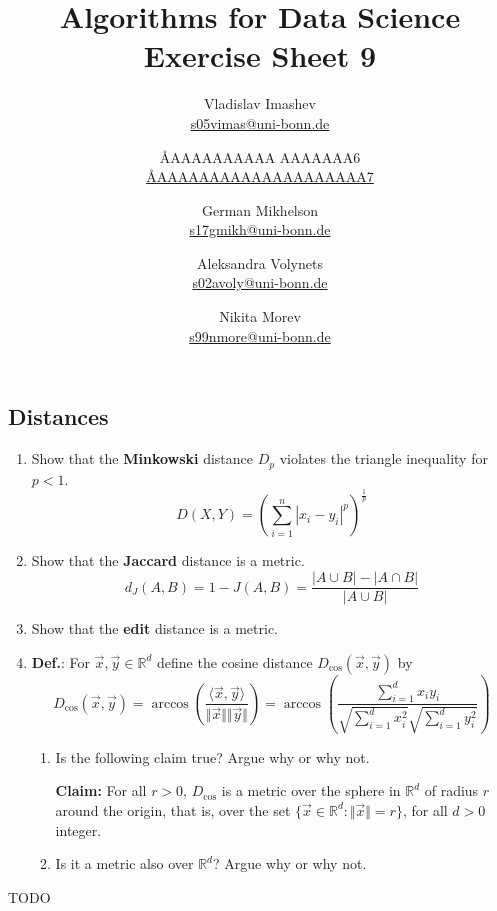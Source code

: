 \documentclass{article}
\title{Algorithms for Data Science \\ Exercise Sheet 9}
\author{
  Vladislav Imashev \\ \href{mailto:s05vimas@uni-bonn.de}{s05vimas@uni-bonn.de} \and
  \AA{AAAAAAAAAA AAAAAAA}{6} \\ \href{mailto:\AA{AAAAAAAAAAAAAAAAAAAA}{7}}{\AA{AAAAAAAAAAAAAAAAAAAA}{7}} \and
  German Mikhelson \\ \href{mailto:s17gmikh@uni-bonn.de}{s17gmikh@uni-bonn.de} \and
  Aleksandra Volynets \\ \href{mailto:s02avoly@uni-bonn.de}{s02avoly@uni-bonn.de} \and
  Nikita Morev \\ \href{mailto:s99nmore@uni-bonn.de}{s99nmore@uni-bonn.de}
}
\newcommand{\R}{\mathbb{R}}
\begin{document}
  \maketitle

  \setcounter{section}{9}
  \subsection{Distances}
  \begin{centerframebox}
    \begin{enumerate}[label=(\roman*)]
      \item Show that the \textbf{Minkowski} distance $D_p$ violates the triangle inequality for $p < 1$.
      \[ D\left(X,Y\right) = \left(\sum_{i=1}^n |x_i-y_i|^p\right)^{\frac{1}{p}} \]
      \item Show that the \textbf{Jaccard} distance is a metric.
      \[ d_J(A,B) = 1 - J(A,B) = \frac{|A \cup B| - |A \cap B|}{|A \cup B|} \]
      \item Show that the \textbf{edit} distance is a metric.

      \item \textbf{Def.}: For $\vec{x},\vec{y}\in \R^d$ define the cosine distance
      $D_{\cos}(\vec{x}, \vec{y})$ by
      \[ D_{\cos}(\vec{x},\vec{y}) =
      \arccos\left(\frac{\langle\vec{x},\vec{y}\rangle}{\Vert{\vec{x}}\Vert\Vert{\vec{y}}\Vert}\right) =
      \arccos\left(\frac{\sum_{i=1}^{d}x_{i}y_{i}}{\sqrt{\sum_{i=1}^{d}x_{i}^{2}}\sqrt{\sum_{i=1}^{d}y_{i}^{2}}}\right) \]

      \begin{enumerate}
        \item  Is the following claim true? Argue why or why not.

        \textbf{Claim:} For all $r > 0$, $D_{\cos}$ is a metric over the sphere in $\R^d$ of radius $r$ around the origin,
        that is, over the set $\{\vec{x} \in \R^d : \Vert\vec{x}\Vert = r \}$,
        for all $d > 0$ integer.
        \item Is it a metric also over $\R^d$? Argue why or why not.
      \end{enumerate}
    \end{enumerate}
  \end{centerframebox}
  TODO %
\end{document}

